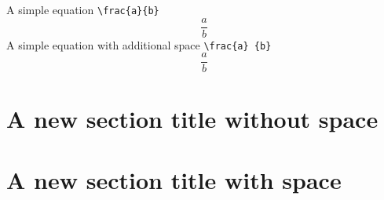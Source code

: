 \documentclass{article}
\begin{document}
A simple equation \verb|\frac{a}{b}|
\begin{displaymath}
\frac{a}{b}
\end{displaymath}
A simple equation with additional space \verb|\frac{a} {b}|
$$
\frac{a}{b}
$$

\section [Section without space]{A new section title without space}

\section [Section with space] {A new section title with space}
\end{document}
